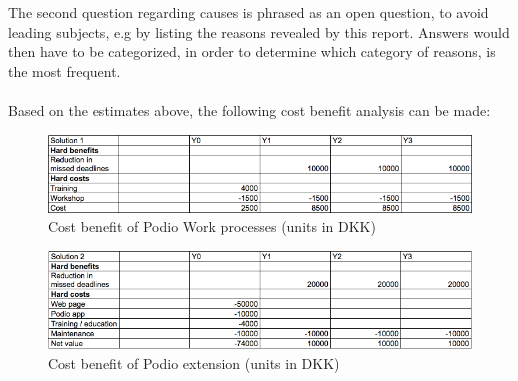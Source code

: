 The second question regarding causes is phrased as an open question, to avoid leading subjects, e.g by listing the reasons revealed by this report. Answers would then have to be categorized, in order to determine which category of reasons, is the most frequent.
\\ \\
Based on the estimates above, the following cost benefit analysis can be made:
\newpage
\begin{figure}[h!]
  \centering
\includegraphics[scale=0.6]{Pictures/cost-benefit1.png}
    \caption{Cost benefit of Podio Work processes (units in DKK)}
\end{figure}
\begin{figure}[h!]
  \centering
\includegraphics[scale=0.6]{Pictures/cost-benefit2.png}
    \caption{Cost benefit of Podio extension (units in DKK)}
\end{figure}
